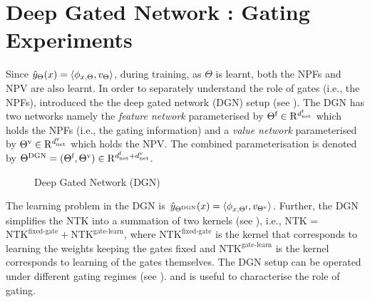 \section{Deep Gated Network : Gating Experiments}
Since $\hat{y}_{\Theta}(x)=\langle \phi_{x,\Theta},v_{\Theta}\rangle$, during training, as $\Theta$ is learnt, both the NPFs and NPV are also learnt. In order to separately understand the role of gates (i.e., the NPFs),  \cite{npk} introduced the the deep gated network (DGN) setup (see ).  The DGN has two networks namely the \emph{feature network} parameterised by $\Theta^{\textrm{f}}\in\mathrm{R}^{d^{\text{f}}_{\text{net}}}$ which holds the NPFs (i.e., the gating information) and a \emph{value network} parameterised by ${\Theta}^{\text{v}}\in\mathrm{R}^{d^{\text{v}}_{\text{net}}}$ which holds the NPV.  The combined parameterisation is denoted by $\Theta^{\text{DGN}}=(\Theta^{\textrm{f}},{\Theta}^{\text{v}})\in \mathrm{R}^{d^{\text{f}}_{\text{net}}+d^{\text{v}}_{\text{net}}}$.  
\FloatBarrier
\begin{figure}[h]
\caption{Deep Gated Network (DGN)}
\label{fig:dgn}
\end{figure}
The learning problem in the DGN is $\hat{y}_{\Theta^{\text{DGN}}}(x)=\langle \phi_{x,\Theta^{\textrm{f}}},v_{{\Theta}^{\text{v}}}\rangle$. Further, the DGN simplifies the NTK into a summation of two kernels (see ), i.e., NTK = $\text{NTK}^{\text{fixed-gate}}+ \text{NTK}^\text{gate-learn}$, where $\text{NTK}^{\text{fixed-gate}}$ is the kernel that corresponds to learning the weights keeping the gates fixed and $\text{NTK}^\text{gate-learn}$ is the kernel corresponds to learning of the gates themselves. The DGN setup can be operated under different gating regimes (see ). and is useful to characterise the role of gating.
